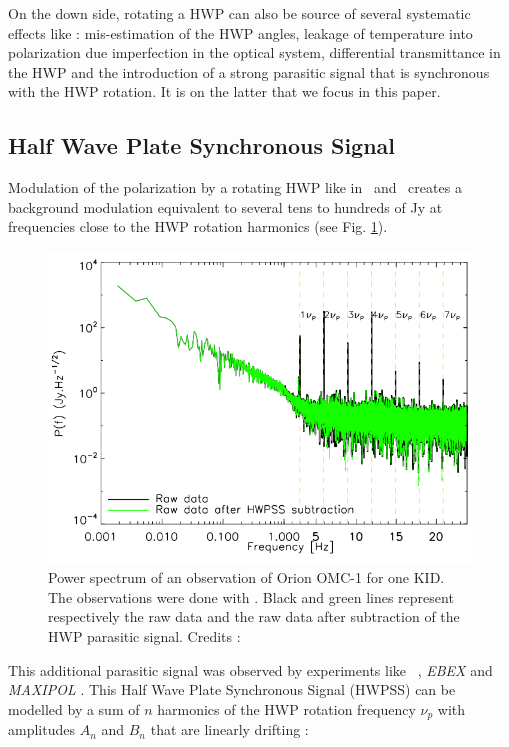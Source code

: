 On the down side, rotating a HWP can also be source of several systematic effects like : mis-estimation of the HWP angles, leakage of temperature into polarization due imperfection in the optical system, differential transmittance in the HWP \citep{2009MNRAS.397..634B,2018SPIE10708E..48S} and the introduction of a strong parasitic signal that is synchronous with the HWP rotation. It is on the latter that we focus in this paper.

\subsection{Half Wave Plate Synchronous Signal}

Modulation of the polarization by a rotating HWP like in \nika\ and \nikad\ creates a background modulation equivalent to several tens to hundreds of Jy at frequencies close to the HWP rotation harmonics \citep{2017A&A...599A..34R} (see Fig. \ref{fig:hwp_power_spectrum}).

\begin{figure}[h]
\center
\includegraphics[clip, angle=0, width=\columnwidth]{Figures/hwp_power_spectrum.png}
\caption{Power spectrum of an observation of Orion OMC-1 for one KID. The observations were done with \nika . Black and green lines represent respectively the raw data and the raw data after subtraction of the HWP parasitic signal. Credits : \citet{2017A&A...599A..34R} }
\label{fig:hwp_power_spectrum}
\end{figure}

This additional parasitic signal was observed by experiments like \ , \emph{EBEX} \citep{2010SPIE.7741E..1CR} and \emph{MAXIPOL} \citep{2007ApJ...665...42J}. This Half Wave Plate Synchronous Signal (HWPSS) can be modelled by a sum of $n$ harmonics of the HWP rotation frequency $\nu_{p}$ with amplitudes $A_{n}$ and $B_{n}$ that are linearly drifting :

